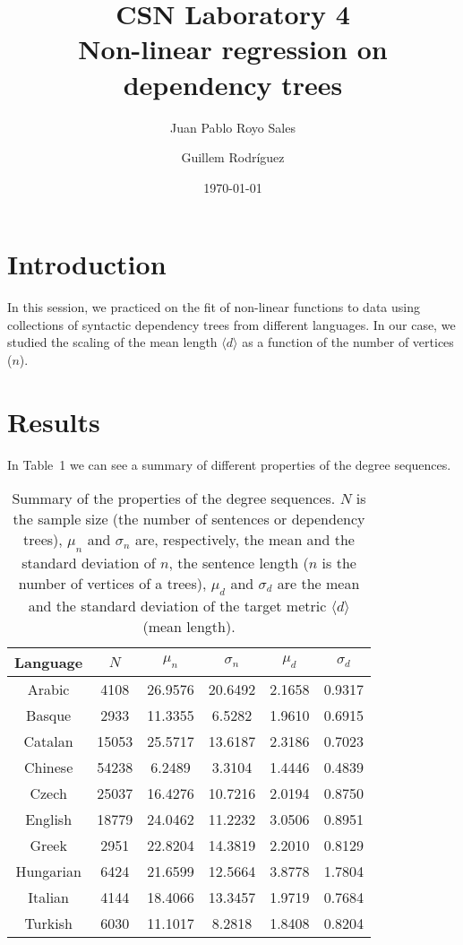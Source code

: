 \documentclass{article}
\title{CSN Laboratory 4 \\
    \large Non-linear regression on dependency trees}
\author{
  Juan Pablo Royo Sales
  \and
  Guillem Rodríguez
}
\date{\today}
\begin{document}
\maketitle

\section{Introduction}
In this session, we practiced on the fit of non-linear functions to data using collections of syntactic dependency trees from different languages. In our case, we studied the scaling of the mean length $\langle d \rangle$ as a function of the number of vertices ($n$).

\section{Results}
In Table~1 we can see a summary of different properties of the degree sequences.
\begin{table}[h!]
\centering
\begin{tabular}{cccccc}
    \hline
    Language & $N$ & $\mu_n $ & $\sigma_n$ & $\mu_d$ & $\sigma_d$ \\
    \hline
    Arabic      & 4108      & 26.9576   & 20.6492   & 2.1658    & 0.9317 \\
    Basque      & 2933      & 11.3355   & 6.5282    & 1.9610    & 0.6915 \\
    Catalan     & 15053     & 25.5717   & 13.6187   & 2.3186    & 0.7023 \\
    Chinese     & 54238     & 6.2489    & 3.3104    & 1.4446    & 0.4839 \\
    Czech       & 25037     & 16.4276   & 10.7216   & 2.0194    & 0.8750 \\
    English     & 18779     & 24.0462   & 11.2232   & 3.0506    & 0.8951 \\
    Greek       & 2951      & 22.8204   & 14.3819   & 2.2010    & 0.8129 \\
    Hungarian   & 6424      & 21.6599   & 12.5664   & 3.8778    & 1.7804 \\
    Italian     & 4144      & 18.4066   & 13.3457   & 1.9719    & 0.7684 \\
    Turkish     & 6030      & 11.1017   & 8.2818    & 1.8408    & 0.8204 \\
    \hline
\end{tabular}
\label{Table:T1}
\caption{Summary of the properties of the degree sequences. $N$ is the sample
size (the number of sentences or dependency trees), $\mu_n$ and $\sigma_n$ are, respectively,
the mean and the standard deviation of $n$, the sentence length ($n$ is the number
of vertices of a trees), $\mu_d$ and $\sigma_d$ are the mean and the standard deviation of
the target metric $\langle d \rangle$ (mean length).}
\end{table}
\end{document}
